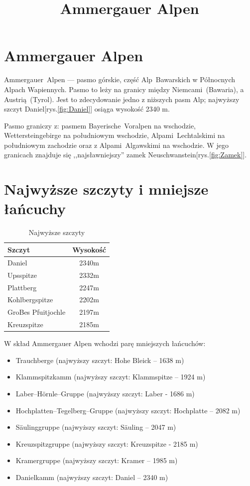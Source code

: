 \documentclass[a4paper,12pt]{article}
\title{Ammergauer Alpen}
\author{}
\begin{document}
\maketitle
\section {Ammergauer Alpen}

Ammergauer~Alpen --- pasmo górskie, część Alp~Bawarskich w Północnych Alpach Wapiennych. Pasmo to leży na granicy między Niemcami~(Bawaria), a Austrią~(Tyrol). Jest to zdecydowanie jedno z niższych pasm Alp; najwyższy szczyt Daniel[rys.\ref{fig:Daniel}] osiąga wysokość 2340 m.

Pasmo graniczy z: pasmem Bayerische~Voralpen na wschodzie, Wettersteingebirge na południowym wschodzie, Alpami~Lechtalskimi na południowym zachodzie oraz z Alpami~Algawskimi na wschodzie. W jego granicach znajduje się ,,najsławniejszy'' zamek Neuschwanstein[rys.\ref{fig:Zamek}].

\section {Najwyższe szczyty i mniejsze łańcuchy}
\begin{table}[h]
	\begin{center}
	\begin{tabular}{lc}
	\textbf{Szczyt}&\textbf{Wysokość}\\
	\hline
	Daniel&2340m\\
	Upsspitze&2332m\\
	Plattberg&2247m\\
	Kohlbergspitze&2202m\\
	GroBes Pfuitjochle&2197m\\
	Kreuzspitze&2185m\\
	\hline
	\end{tabular}
	\end{center}
\caption{Najwyższe szczyty}
\label{tab1}
\end{table}

W skład Ammergauer Alpen wchodzi parę mniejszych łańcuchów:
\begin{itemize}
\item Trauchberge (najwyższy szczyt: Hohe Bleick -- 1638 m)
\item Klammspitzkamm (najwyższy szczyt: Klammspitze -- 1924 m)
\item Laber--Hörnle--Gruppe (najwyższy szczyt: Laber - 1686 m)
\item Hochplatten--Tegelberg--Gruppe (najwyższy szczyt: Hochplatte -- 2082 m)
\item Säulinggruppe (najwyższy szczyt: Säuling -- 2047 m)
\item Kreuzspitzgruppe (najwyższy szczyt: Kreuzspitze - 2185 m)
\item Kramergruppe (najwyższy szczyt: Kramer -- 1985 m)
\item Danielkamm (najwyższy szczyt: Daniel -- 2340 m)
\end{itemize}
\end{document}
